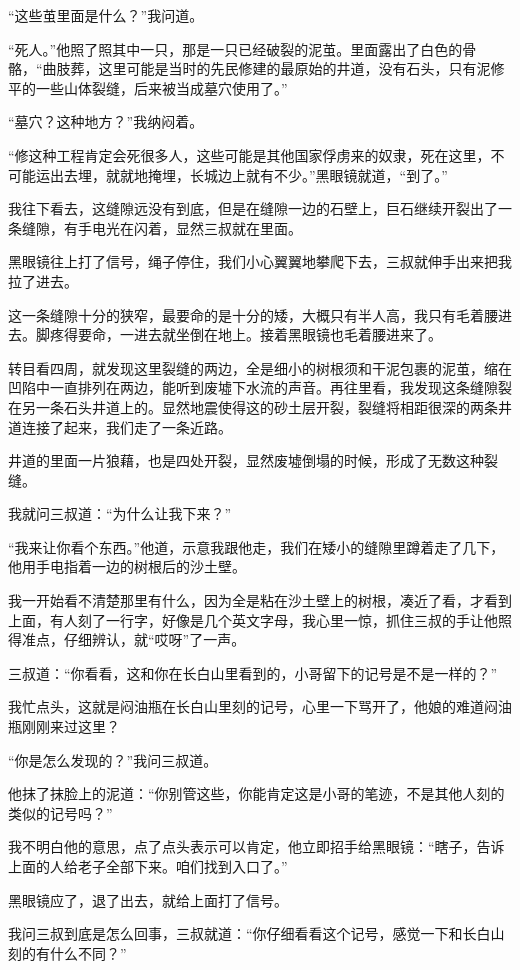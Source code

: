 “这些茧里面是什么？”我问道。

“死人。”他照了照其中一只，那是一只已经破裂的泥茧。里面露出了白色的骨骼，“曲肢葬，这里可能是当时的先民修建的最原始的井道，没有石头，只有泥修平的一些山体裂缝，后来被当成墓穴使用了。”

“墓穴？这种地方？”我纳闷着。

“修这种工程肯定会死很多人，这些可能是其他国家俘虏来的奴隶，死在这里，不可能运出去埋，就就地掩埋，长城边上就有不少。”黑眼镜就道，“到了。”

我往下看去，这缝隙远没有到底，但是在缝隙一边的石壁上，巨石继续开裂出了一条缝隙，有手电光在闪着，显然三叔就在里面。

黑眼镜往上打了信号，绳子停住，我们小心翼翼地攀爬下去，三叔就伸手出来把我拉了进去。

这一条缝隙十分的狭窄，最要命的是十分的矮，大概只有半人高，我只有毛着腰进去。脚疼得要命，一进去就坐倒在地上。接着黑眼镜也毛着腰进来了。

转目看四周，就发现这里裂缝的两边，全是细小的树根须和干泥包裹的泥茧，缩在凹陷中一直排列在两边，能听到废墟下水流的声音。再往里看，我发现这条缝隙裂在另一条石头井道上的。显然地震使得这的砂土层开裂，裂缝将相距很深的两条井道连接了起来，我们走了一条近路。

井道的里面一片狼藉，也是四处开裂，显然废墟倒塌的时候，形成了无数这种裂缝。

我就问三叔道：“为什么让我下来？”

“我来让你看个东西。”他道，示意我跟他走，我们在矮小的缝隙里蹲着走了几下，他用手电指着一边的树根后的沙土壁。

我一开始看不清楚那里有什么，因为全是粘在沙土壁上的树根，凑近了看，才看到上面，有人刻了一行字，好像是几个英文字母，我心里一惊，抓住三叔的手让他照得准点，仔细辨认，就“哎呀”了一声。

三叔道：“你看看，这和你在长白山里看到的，小哥留下的记号是不是一样的？”

我忙点头，这就是闷油瓶在长白山里刻的记号，心里一下骂开了，他娘的难道闷油瓶刚刚来过这里？

“你是怎么发现的？”我问三叔道。

他抹了抹脸上的泥道：“你别管这些，你能肯定这是小哥的笔迹，不是其他人刻的类似的记号吗？”

我不明白他的意思，点了点头表示可以肯定，他立即招手给黑眼镜：“瞎子，告诉上面的人给老子全部下来。咱们找到入口了。”

黑眼镜应了，退了出去，就给上面打了信号。

我问三叔到底是怎么回事，三叔就道：“你仔细看看这个记号，感觉一下和长白山刻的有什么不同？”

